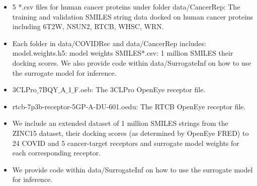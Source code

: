 {\begin{itemize}
    \item {5 *.csv files for human cancer proteins under folder data/CancerRep:} The training and validation SMILES string data docked on human cancer proteins including 6T2W, NSUN2, RTCB, WHSC, WRN.
    \item {Each folder in data/COVIDRec and data/CancerRep includes:
model.weights.h5: model weights
SMILES*.csv: 1 million SMILES their docking scores.
We also provide code within data/SurrogateInf on how to use the surrogate model for inference.}


    \item {3CLPro$\_$7BQY$\_$A$\_$1$\_$F.oeb:} The 3CLPro OpenEye receptor file.
    \item {rtcb-7p3b-receptor-5GP-A-DU-601.oedu:}  The RTCB OpenEye receptor file.
    \item {  We include an extended dataset of 1 million SMILES strings from the ZINC15 dataset, their docking scores (as determined by OpenEye FRED) to 24 COVID and 5 cancer-target receptors and surrogate model weights for each corresponding receptor.}
    \item We provide code within data/SurrogateInf on how to use the surrogate model for inference.
\end{itemize}}





















